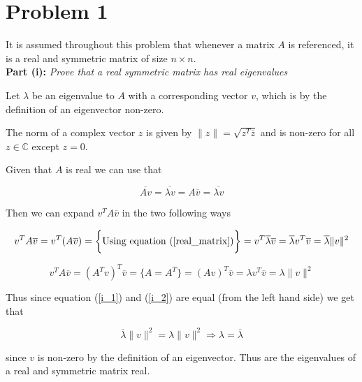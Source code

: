 \section*{Problem 1}
It is assumed throughout this problem that whenever a matrix $A$ is referenced, it is a real and symmetric matrix of size $n \times n$.
\\

\textbf{Part (i):} \textit{Prove that a real symmetric matrix has real eigenvalues}

Let $\lambda$ be an eigenvalue to $A$ with a corresponding vector $v$, which is by the definition of an eigenvector non-zero.

The norm of a complex vector $z$ is given by $ \lVert z \rVert = \sqrt{z^T \overline{z}}$ and is non-zero for all $z \in \mathbb{C}$ except $z = 0$.

Given that $A$ is real we can use that

\begin{equation}
  \overline{Av} = \overline{\lambda v} = A \overline{v} = \overline{\lambda v}
  \label{real_matrix}
\end{equation}

Then we can expand $v^T A \overline{v}$ in the two following ways

\begin{equation}
  v^T A \overline{v} = v^T (A \overline{v}) = \bigg\{ \text{Using equation (\ref{real_matrix})}\bigg\} = v^T \overline{\lambda} \overline{v} =  \overline{\lambda} v^T  \overline{v} = \overline{\lambda} \lVert v \rVert ^2
  \label{i_1}
\end{equation}

\begin{equation}
  v^T A \overline{v} = (A^T v)^T \overline{v} = \bigg\{A = A^T \bigg\} = (A v)^T \overline{v} = \lambda v^T \overline{v} = \lambda \lVert v \rVert ^2
  \label{i_2}
\end{equation}

Thus since equation (\ref{i_1}) and (\ref{i_2}) are equal (from the left hand side) we get that

\begin{equation}
  \overline{\lambda} \lVert v \rVert^2= \lambda \lVert v \rVert^2 \Rightarrow \lambda = \overline{\lambda}
\end{equation}

 since $v$ is non-zero by the definition of an eigenvector. Thus are the eigenvalues of a real and symmetric matrix real.
\\

